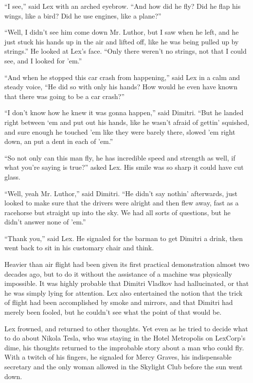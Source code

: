 \documentclass[ebook,12pt]{memoir}
\begin{document}
``I see,'' said Lex with an arched eyebrow. ``And how did he fly? Did he
flap his wings, like a bird? Did he use engines, like a plane?''

``Well, I didn't see him come down Mr. Luthor, but I saw when he left,
and he just stuck his hands up in the air and lifted off, like he was
being pulled up by strings.'' He looked at Lex's face. ``Only there
weren't no strings, not that I could see, and I looked for 'em.''

``And when he stopped this car crash from happening,'' said Lex in a
calm and steady voice, ``He did so with only his hands? How would he
even have known that there was going to be a car crash?''

``I don't know how he knew it was gonna happen,'' said Dimitri. ``But he
landed right between `em and put out his hands, like he wasn't afraid of
gettin' squished, and sure enough he touched 'em like they were barely
there, slowed 'em right down, an put a dent in each of 'em.''

``So not only can this man fly, he has incredible speed and strength as
well, if what you're saying is true?'' asked Lex. His smile was so sharp
it could have cut glass.

``Well, yeah Mr. Luthor,'' said Dimitri. ``He didn't say nothin'
afterwards, just looked to make sure that the drivers were alright and
then flew away, fast as a racehorse but straight up into the sky. We had
all sorts of questions, but he didn't answer none of 'em.''

``Thank you,'' said Lex. He signaled for the barman to get Dimitri a
drink, then went back to sit in his customary chair and think.

Heavier than air flight had been given its first practical demonstration
almost two decades ago, but to do it without the assistance of a machine
was physically impossible. It was highly probable that Dimitri Vladkov
had hallucinated, or that he was simply lying for attention. Lex also
entertained the notion that the trick of flight had been accomplished by
smoke and mirrors, and that Dimitri had merely been fooled, but he
couldn't see what the point of that would be.

Lex frowned, and returned to other thoughts. Yet even as he tried to
decide what to do about Nikola Tesla, who was staying in the Hotel
Metropolis on LexCorp's dime, his thoughts returned to the improbable
story about a man who could fly. With a twitch of his fingers, he
signaled for Mercy Graves, his indispensable secretary and the only
woman allowed in the Skylight Club before the sun went down.
\end{document}
